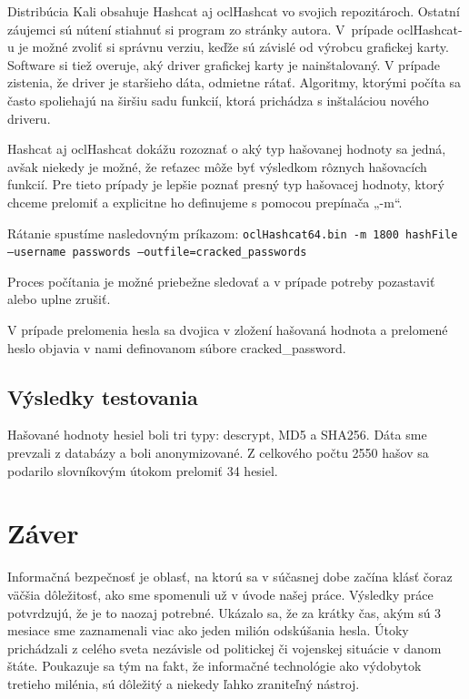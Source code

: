 \documentclass[12pt, oneside]{book}
\begin{document}
Distribúcia Kali obsahuje Hashcat aj oclHashcat vo svojich repozitároch.
Ostatní záujemci sú nútení stiahnuť si program zo stránky autora. 
V~prípade oclHashcat-u je možné zvoliť si správnu verziu, keďže sú závislé od výrobcu grafickej karty. 
Software si tiež overuje, aký driver grafickej karty je nainštalovaný. 
V prípade zistenia, že driver je staršieho dáta, odmietne rátať.
Algoritmy, ktorými počíta sa často spoliehajú na širšiu sadu funkcií, ktorá prichádza s inštaláciou nového driveru.

Hashcat aj oclHashcat dokážu rozoznať o aký typ hašovanej hodnoty sa jedná, avšak niekedy je možné, že reťazec môže byť výsledkom rôznych hašovacích funkcií. 
Pre tieto prípady je lepšie poznať presný typ hašovacej hodnoty, ktorý chceme prelomiť a explicitne ho definujeme s pomocou prepínača „-m“.

Rátanie spustíme nasledovným príkazom:
\texttt{oclHashcat64.bin -m 1800 hashFile --username passwords --outfile=cracked\_passwords}

Proces počítania je možné priebežne sledovať a v prípade potreby pozastaviť alebo uplne zrušiť.

V prípade prelomenia hesla sa dvojica v zložení hašovaná hodnota a prelomené heslo objavia v nami definovanom súbore cracked\_password.

\section{Výsledky testovania}

Hašované hodnoty hesiel boli tri typy: descrypt, MD5 a SHA256.
Dáta sme prevzali z databázy a boli anonymizované.
Z celkového počtu 2550 hašov sa podarilo slovníkovým útokom prelomiť 34 hesiel.

\chapter*{Záver}

Informačná bezpečnosť je oblasť, na ktorú sa v súčasnej dobe začína klásť čoraz väčšia dôležitosť, ako sme spomenuli už v úvode našej práce.
Výsledky práce potvrdzujú, že je to naozaj potrebné.
Ukázalo sa, že za krátky čas, akým sú 3 mesiace sme zaznamenali viac ako jeden milión odskúšania hesla.
Útoky prichádzali z celého sveta nezávisle od politickej či vojenskej situácie v danom štáte.
Poukazuje sa tým na fakt, že informačné technológie ako výdobytok tretieho milénia, sú dôležitý a niekedy ľahko zraniteľný nástroj.
\end{document}
